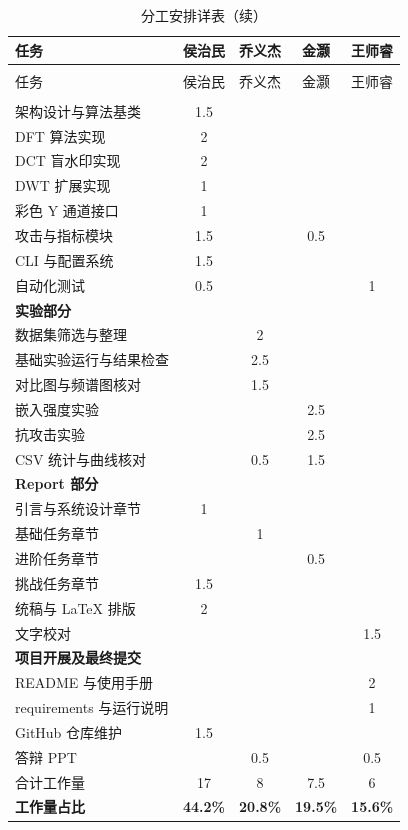 \documentclass[11pt]{ctexart}
\begin{document}
\begin{longtable}{p{7.2cm}cccc}
  \caption{分工安排详表}\label{tab:work}\\
  \toprule
  任务 & 侯治民 & 乔义杰 & 金灏 & 王师睿 \\
  \midrule
  \endfirsthead
  \caption[]{分工安排详表（续）}\\
  \toprule
  任务 & 侯治民 & 乔义杰 & 金灏 & 王师睿 \\
  \midrule
  \endhead
  \bottomrule
  \endfoot
  \multicolumn{5}{l}{\textbf{Coding 部分}} \\
  架构设计与算法基类 & 1.5 & & & \\
  DFT 算法实现 & 2 & & & \\
  DCT 盲水印实现 & 2 & & & \\
  DWT 扩展实现 & 1 & & & \\
  彩色 Y 通道接口 & 1 & & & \\
  攻击与指标模块 & 1.5 & & 0.5 & \\
  CLI 与配置系统 & 1.5 & & & \\
  自动化测试 & 0.5 & & & 1 \\
  \multicolumn{5}{l}{\textbf{实验部分}} \\
  数据集筛选与整理 & & 2 & & \\
  基础实验运行与结果检查 & & 2.5 & & \\
  对比图与频谱图核对 & & 1.5 & & \\
  嵌入强度实验 & & & 2.5 & \\
  抗攻击实验 & & & 2.5 & \\
  CSV 统计与曲线核对 & & 0.5 & 1.5 & \\
  \multicolumn{5}{l}{\textbf{Report 部分}} \\
  引言与系统设计章节 & 1 & & & \\
  基础任务章节 & & 1 & & \\
  进阶任务章节 & & & 0.5 & \\
  挑战任务章节 & 1.5 & & & \\
  统稿与 \LaTeX{} 排版 & 2 & & & \\
  文字校对 & & & & 1.5 \\
  \multicolumn{5}{l}{\textbf{项目开展及最终提交}} \\
  README 与使用手册 & & & & 2 \\
  requirements 与运行说明 & & & & 1 \\
  GitHub 仓库维护 & 1.5 & & & \\
  答辩 PPT & & 0.5 & & 0.5 \\
  \midrule
  合计工作量 & 17 & 8 & 7.5 & 6 \\
  \textbf{工作量占比} & \textbf{44.2\%} & \textbf{20.8\%} & \textbf{19.5\%} & \textbf{15.6\%} \\
\end{longtable}
\end{document}
